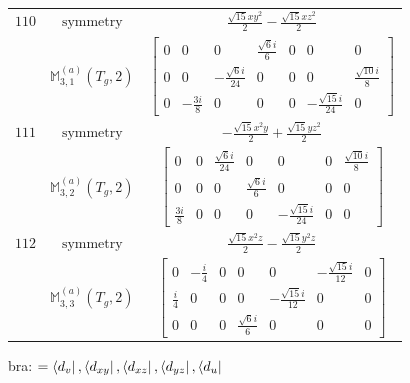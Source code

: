 \documentclass[fleqn,8pt,landscape]{jsarticle}
\begin{document}
\begin{longtable}{ccc}
$ 110 $ & $ \text{symmetry} $ & $ \frac{\sqrt{15} x y^{2}}{2} - \frac{\sqrt{15} x z^{2}}{2} $ \\
$  $ & $ \mathbb{M}_{3,1}^{(a)}(T_{g},2) $ & $ \begin{bmatrix} 0 & 0 & 0 & \frac{\sqrt{6} i}{6} & 0 & 0 & 0 \\ 0 & 0 & - \frac{\sqrt{6} i}{24} & 0 & 0 & 0 & \frac{\sqrt{10} i}{8} \\ 0 & - \frac{3 i}{8} & 0 & 0 & 0 & - \frac{\sqrt{15} i}{24} & 0 \end{bmatrix} $ \\ \hline
$ 111 $ & $ \text{symmetry} $ & $ - \frac{\sqrt{15} x^{2} y}{2} + \frac{\sqrt{15} y z^{2}}{2} $ \\
$  $ & $ \mathbb{M}_{3,2}^{(a)}(T_{g},2) $ & $ \begin{bmatrix} 0 & 0 & \frac{\sqrt{6} i}{24} & 0 & 0 & 0 & \frac{\sqrt{10} i}{8} \\ 0 & 0 & 0 & \frac{\sqrt{6} i}{6} & 0 & 0 & 0 \\ \frac{3 i}{8} & 0 & 0 & 0 & - \frac{\sqrt{15} i}{24} & 0 & 0 \end{bmatrix} $ \\ \hline
$ 112 $ & $ \text{symmetry} $ & $ \frac{\sqrt{15} x^{2} z}{2} - \frac{\sqrt{15} y^{2} z}{2} $ \\
$  $ & $ \mathbb{M}_{3,3}^{(a)}(T_{g},2) $ & $ \begin{bmatrix} 0 & - \frac{i}{4} & 0 & 0 & 0 & - \frac{\sqrt{15} i}{12} & 0 \\ \frac{i}{4} & 0 & 0 & 0 & - \frac{\sqrt{15} i}{12} & 0 & 0 \\ 0 & 0 & 0 & \frac{\sqrt{6} i}{6} & 0 & 0 & 0 \end{bmatrix} $ \\ \hline
\end{longtable}
bra: $=\bra{d_{v}}, \bra{d_{xy}}, \bra{d_{xz}}, \bra{d_{yz}}, \bra{d_{u}}$
\end{document}
